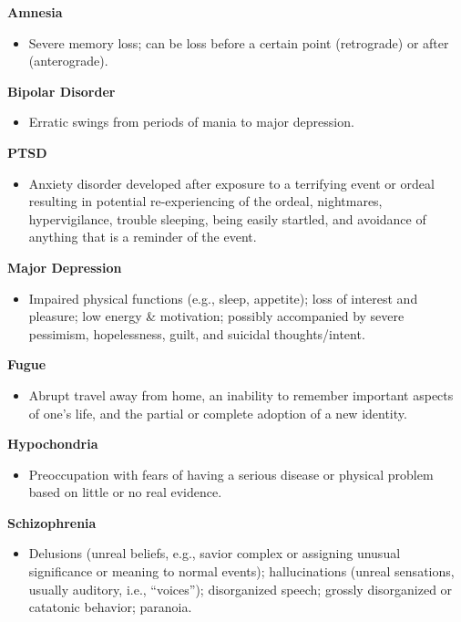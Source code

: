 \textbf{Amnesia}

\begin{itemize}
\tightlist
\item
  Severe memory loss; can be loss before a certain point (retrograde) or
  after (anterograde).
\end{itemize}

\textbf{Bipolar Disorder}

\begin{itemize}
\tightlist
\item
  Erratic swings from periods of mania to major depression.
\end{itemize}

\textbf{PTSD}

\begin{itemize}
\tightlist
\item
  Anxiety disorder developed after exposure to a terrifying event or
  ordeal resulting in potential re-experiencing of the ordeal,
  nightmares, hypervigilance, trouble sleeping, being easily startled,
  and avoidance of anything that is a reminder of the event.
\end{itemize}

\textbf{Major Depression}

\begin{itemize}
\tightlist
\item
  Impaired physical functions (e.g., sleep, appetite); loss of interest
  and pleasure; low energy \& motivation; possibly accompanied by severe
  pessimism, hopelessness, guilt, and suicidal thoughts/intent.
\end{itemize}

\textbf{Fugue}

\begin{itemize}
\tightlist
\item
  Abrupt travel away from home, an inability to remember important
  aspects of one's life, and the partial or complete adoption of a new
  identity.
\end{itemize}

\textbf{Hypochondria}

\begin{itemize}
\tightlist
\item
  Preoccupation with fears of having a serious disease or physical
  problem based on little or no real evidence.
\end{itemize}

\textbf{Schizophrenia}

\begin{itemize}
\tightlist
\item
  Delusions (unreal beliefs, e.g., savior complex or assigning unusual
  significance or meaning to normal events); hallucinations (unreal
  sensations, usually auditory, i.e., ``voices''); disorganized speech;
  grossly disorganized or catatonic behavior; paranoia.
\end{itemize}


